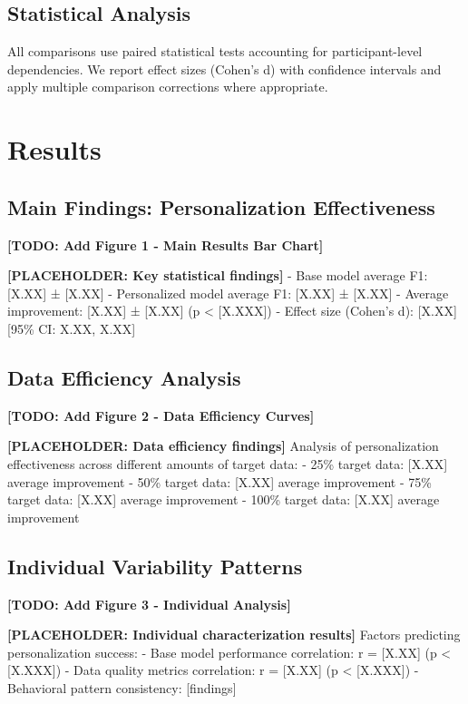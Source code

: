 \documentclass[twocolumn]{article}
\begin{document}
\subsection{Statistical Analysis}
All comparisons use paired statistical tests accounting for participant-level dependencies. We report effect sizes (Cohen's d) with confidence intervals and apply multiple comparison corrections where appropriate.

\section{Results}
\label{sec:results}


\subsection{Main Findings: Personalization Effectiveness}
\textbf{[TODO: Add Figure 1 - Main Results Bar Chart]}

\textbf{[PLACEHOLDER: Key statistical findings]}
- Base model average F1: [X.XX] ± [X.XX]
- Personalized model average F1: [X.XX] ± [X.XX]  
- Average improvement: [X.XX] ± [X.XX] (p < [X.XXX])
- Effect size (Cohen's d): [X.XX] [95\% CI: X.XX, X.XX]

\subsection{Data Efficiency Analysis}
\textbf{[TODO: Add Figure 2 - Data Efficiency Curves]}

\textbf{[PLACEHOLDER: Data efficiency findings]}
Analysis of personalization effectiveness across different amounts of target data:
- 25\% target data: [X.XX] average improvement
- 50\% target data: [X.XX] average improvement  
- 75\% target data: [X.XX] average improvement
- 100\% target data: [X.XX] average improvement

\subsection{Individual Variability Patterns}
\textbf{[TODO: Add Figure 3 - Individual Analysis]}

\textbf{[PLACEHOLDER: Individual characterization results]}
Factors predicting personalization success:
- Base model performance correlation: r = [X.XX] (p < [X.XXX])
- Data quality metrics correlation: r = [X.XX] (p < [X.XXX])
- Behavioral pattern consistency: [findings]
\end{document}
